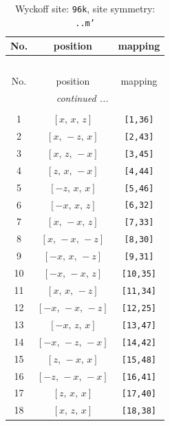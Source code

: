 \documentclass[fleqn,8pt]{jsarticle}
\begin{document}
\begin{longtable}{ccc}
\caption{Wyckoff site: {\tt 96k}, site symmetry: {\tt ..m'}}
 \\
 \hline \hline
No. & position & mapping \\ \hline \endfirsthead

\multicolumn{2}{l}{\tablename\ \thetable{}} \\
 \hline \hline
No. & position & mapping \\ \hline \endhead

 \hline \hline
\multicolumn{2}{r}{\footnotesize\it continued ...} \\ \endfoot

 \hline \hline
\multicolumn{2}{r}{} \\ \endlastfoot

1 & $\left[ x,\, x,\, z \right]$ & {\tt [1,36]} \\ \hline
2 & $\left[ x,\, - z,\, x \right]$ & {\tt [2,43]} \\ \hline
3 & $\left[ x,\, z,\, - x \right]$ & {\tt [3,45]} \\ \hline
4 & $\left[ z,\, x,\, - x \right]$ & {\tt [4,44]} \\ \hline
5 & $\left[ - z,\, x,\, x \right]$ & {\tt [5,46]} \\ \hline
6 & $\left[ - x,\, x,\, z \right]$ & {\tt [6,32]} \\ \hline
7 & $\left[ x,\, - x,\, z \right]$ & {\tt [7,33]} \\ \hline
8 & $\left[ x,\, - x,\, - z \right]$ & {\tt [8,30]} \\ \hline
9 & $\left[ - x,\, x,\, - z \right]$ & {\tt [9,31]} \\ \hline
10 & $\left[ - x,\, - x,\, z \right]$ & {\tt [10,35]} \\ \hline
11 & $\left[ x,\, x,\, - z \right]$ & {\tt [11,34]} \\ \hline
12 & $\left[ - x,\, - x,\, - z \right]$ & {\tt [12,25]} \\ \hline
13 & $\left[ - x,\, z,\, x \right]$ & {\tt [13,47]} \\ \hline
14 & $\left[ - x,\, - z,\, - x \right]$ & {\tt [14,42]} \\ \hline
15 & $\left[ z,\, - x,\, x \right]$ & {\tt [15,48]} \\ \hline
16 & $\left[ - z,\, - x,\, - x \right]$ & {\tt [16,41]} \\ \hline
17 & $\left[ z,\, x,\, x \right]$ & {\tt [17,40]} \\ \hline
18 & $\left[ x,\, z,\, x \right]$ & {\tt [18,38]} \\ \hline

\end{longtable}
\end{document}
